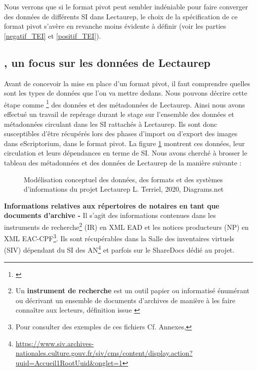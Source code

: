 Nous verrons que si le format pivot peut sembler indéniable pour faire converger des données de différents SI dans Lectaurep, le choix de la spécification de ce format pivot s'avère en revanche moins évidente à définir (voir les parties \ref{negatif_TEI} et \ref{positif_TEI}). 

\subsection{, un focus sur les données de Lectaurep}\label{Circonscrire un monde de données}

Avant de concevoir la mise en place d'un format pivot, il faut comprendre quelles sont les types de données que l'on va mettre dedans. Nous pouvons décrire cette étape comme \footnote{\cite{poupeau_visite_2019}} des données et des métadonnées de Lectaurep. Ainsi nous avons effectué un travail de repérage durant le stage sur l'ensemble des données et métadonnées circulant dans les SI rattachés à Lectaurep. Ils sont donc susceptibles d'être récupérés lors des phases d'import ou d'export des images dans eScriptorium, dans le format pivot.
La figure \ref{fig:modélisation_données_lectaurep} montrent ces données, leur circulation et leurs dépendances en terme de SI. Nous avons cherché à brosser le tableau des métadonnées et des données de Lectaurep de la manière suivante :\\

\begin{figure}[H]
    \centering
    \centerline{}
    \caption{Modélisation conceptuel des données, des formats et des systèmes d'informations du projet Lectaurep \textcopyright L. Terriel, 2020, Diagrams.net}
    \label{fig:modélisation_données_lectaurep}
\end{figure}

\textbf{Informations relatives aux répertoires de notaires en tant que documents d'archive -} Il s'agit des informations contenues dans les instruments de recherche\footnote{Un \textbf{instrument de recherche} est un outil papier ou informatisé énumérant ou décrivant un ensemble de documents d'archives de manière à les faire connaître aux lecteurs, définition issue \cite{noauthor_abrege_2020}} (IR) en XML EAD et les notices producteurs (NP) 
en XML EAC-CPF\footnote{Pour consulter des exemples de ces fichiers Cf. Annexes, }.
Ils sont récupérables dans la Salle des inventaires virtuels (SIV) dépendant du SI des AN\footnote{\url{https://www.siv.archives-nationales.culture.gouv.fr/siv/cms/content/display.action?uuid=Accueil1RootUuid&onglet=1}} et parfois sur le ShareDocs dédié au projet.\\

